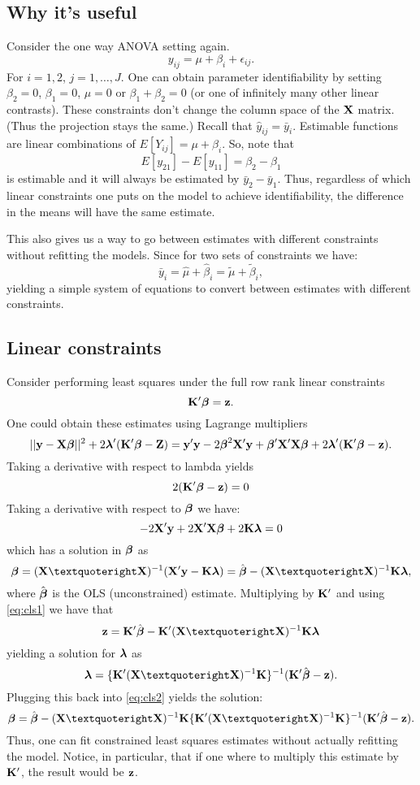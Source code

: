 \subsection{Why it's useful}

Consider the one way ANOVA setting again. 
$$
y_{ij} = \mu + \beta_i + \epsilon_{ij}.
$$
For $i = 1, 2$, $j = 1, \ldots, J$. 
One can obtain parameter identifiability by setting $\beta_2 = 0$, $\beta_1 = 0$, $\mu = 0$ or $\beta_1 + \beta_2 = 0$ (or one of infinitely many other linear contrasts). 
These constraints don't change the column space of the $\mathbf{X}$ matrix. (Thus the projection stays the same.)
Recall that $\hat y_{ij} = \bar y_i$. Estimable functions are linear combinations of $E[Y_{ij}] = \mu + \beta_i$. So, note that
$$
E[y_{21}] - E[y_{11}] = \beta_2 - \beta_1
$$
is estimable and it will always be estimated by $\bar y_2 - \bar y_1$. Thus, regardless of which linear constraints one puts on the
model to achieve identifiability, the difference in the means will have the same estimate. 

This also gives us a way to go between estimates with different constraints without refitting the models. Since for two sets
of constraints we have:
$$
\bar y_i  = \hat \mu + \hat \beta_i = \tilde \mu + \tilde \beta_i,
$$
yielding a simple system of equations to convert between estimates with different constraints.


\subsection{Linear constraints}
Consider performing least squares under the full row rank linear constraints 
$$
\mathbf{K}' \boldsymbol{\beta} = \mathbf{z}.
$$
One could obtain these estimates using Lagrange multipliers
$$
||\mathbf{y} - \mathbf{X} \boldsymbol{\beta}||^2 + 2 \boldsymbol{\lambda}' (\mathbf{K}' \boldsymbol{\beta} - \mathbf{Z})
= \mathbf{y}' \mathbf{y} - 2\boldsymbol{\beta}^2 \mathbf{X}' \mathbf{y} + \boldsymbol{\beta}' \mathbf{X}' \mathbf{X} \boldsymbol{\beta} + 2 \boldsymbol{\lambda}' (\mathbf{K}' \boldsymbol{\beta} - \mathbf{z}).
$$
Taking a derivative with respect to lambda yields
\begin{equation}
\label{eq:cls1}
2 (\mathbf{K}' \boldsymbol{\beta} - \mathbf{z}) = 0
\end{equation}
Taking a derivative with respect to $\boldsymbol{\beta}$ we have:
$$
-2 \mathbf{X}' \mathbf{y} + 2 \mathbf{X}' \mathbf{X} \boldsymbol{\beta} + 2 \mathbf{K} \boldsymbol{\lambda}   = 0
$$
which has a solution in $\boldsymbol{\beta}$ as
\begin{equation}
\label{eq:cls2}
\bbeta = \xtxinv (\bX' \by  -   \bK \blambda) = \hat \bbeta - \xtxinv \bK \blambda,
\end{equation}
where $\hat {\boldsymbol{\beta}}$ is the OLS (unconstrained) estimate.
Multiplying by $\mathbf{K}'$ and using \eqref{eq:cls1} we have that
$$
\bz = \bK' \hat \bbeta - \bK' \xtxinv \bK \blambda
$$
yielding a solution for $\boldsymbol{\lambda}$ as
$$
\blambda = \{\bK' \xtxinv \bK\}^{-1} (\bK' \hat \bbeta - \bz). 
$$
Plugging this back into \eqref{eq:cls2} yields the solution:
$$
\bbeta = \hat \bbeta -  \xtxinv \bK \{\bK' \xtxinv \bK\}^{-1} (\bK' \hat \bbeta - \bz).
$$
Thus, one can fit constrained least squares estimates without actually refitting the model.
Notice, in particular, that if one where to multiply this estimate by $\mathbf{K}'$, the result would be
$\mathbf{z}$.

